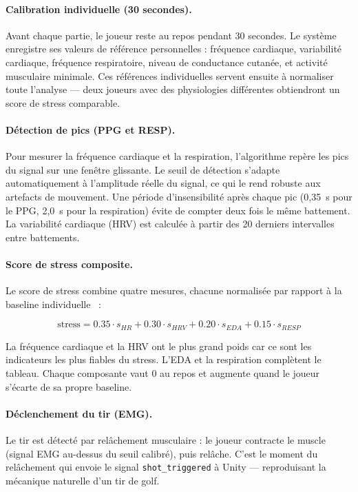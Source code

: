 \documentclass[runningheads]{llncs}
\begin{document}
\paragraph{Calibration individuelle (30 secondes).}
Avant chaque partie, le joueur reste au repos pendant 30 secondes. Le système
enregistre ses valeurs de référence personnelles : fréquence cardiaque, variabilité
cardiaque, fréquence respiratoire, niveau de conductance cutanée, et activité
musculaire minimale. Ces références individuelles servent ensuite à normaliser
toute l'analyse — deux joueurs avec des physiologies différentes obtiendront
un score de stress comparable.

\paragraph{Détection de pics (PPG et RESP).}
Pour mesurer la fréquence cardiaque et la respiration, l'algorithme repère les
pics du signal sur une fenêtre glissante. Le seuil de détection s'adapte
automatiquement à l'amplitude réelle du signal, ce qui le rend robuste aux
artefacts de mouvement. Une période d'insensibilité après chaque pic (0,35~s
pour le PPG, 2,0~s pour la respiration) évite de compter deux fois le même
battement. La variabilité cardiaque (HRV) est calculée à partir des 20 derniers
intervalles entre battements.

\paragraph{Score de stress composite.}
Le score de stress combine quatre mesures, chacune normalisée par rapport à la
baseline individuelle~\cite{wesad2018} :

\begin{equation}
\text{stress} = 0.35 \cdot s_{HR} + 0.30 \cdot s_{HRV} + 0.20 \cdot s_{EDA} + 0.15 \cdot s_{RESP}
\label{eq:stress}
\end{equation}

La fréquence cardiaque et la HRV ont le plus grand poids car ce sont les
indicateurs les plus fiables du stress. L'EDA et la respiration complètent
le tableau. Chaque composante vaut 0 au repos et augmente quand le joueur
s'écarte de sa propre baseline.

\paragraph{Déclenchement du tir (EMG).}
Le tir est détecté par relâchement musculaire : le joueur contracte le muscle
(signal EMG au-dessus du seuil calibré), puis relâche. C'est le moment du
relâchement qui envoie le signal \texttt{shot\_triggered} à Unity —
reproduisant la mécanique naturelle d'un tir de golf.
\end{document}
